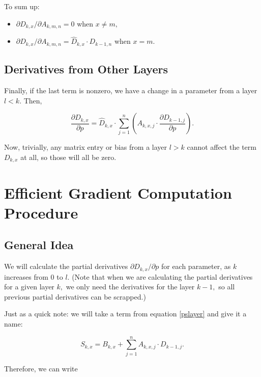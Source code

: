 \documentclass{article}
\begin{document}
To sum up:

\begin{itemize}

\item $\partial D_{k,x} / \partial A_{k,m,n} = 0$ when $x \neq m,$

\item $\partial D_{k,x} / \partial A_{k,m,n} = \hat D_{k, x} \cdot D_{k-1, n}$ when $x = m.$

\end{itemize}

\subsection{Derivatives from Other Layers}

Finally, if the last term is nonzero, we have a change in a parameter from a layer $l < k.$ Then,

\begin{equation}
\frac{\partial D_{k,x}}{\partial p} = \hat D_{k,x} \cdot \sum_{j=1}^n ( A_{k,x,j} \cdot \frac{\partial D_{k-1,j}}{\partial p} ).
\end{equation}

Now, trivially, any matrix entry or bias from a layer $l > k$ cannot affect the term $D_{k,x}$ at all, so those will all be zero.

\section{Efficient Gradient Computation Procedure}

\subsection{General Idea}

We will calculate the partial derivatives $\partial D_{k,x} / \partial p$ for each parameter, as $k$ increases from $0$ to $l.$ (Note that when we are calculating the partial derivatives for a given layer $k,$ we only need the derivatives for the layer $k - 1,$ so all previous partial derivatives can be scrapped.)

Just as a quick note: we will take a term from equation \ref{pslayer} and give it a name:

\begin{equation}
\label{sname}
S_{k,x} = B_{k,x} + \sum_{j=1}^n A_{k,x,j} \cdot D_{k-1,j}.
\end{equation}

Therefore, we can write
\end{document}
